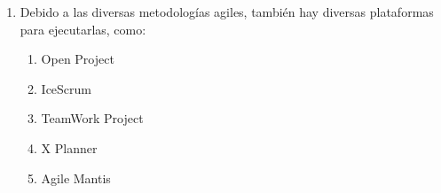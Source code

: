 \documentclass{article} %
\begin{document}
\begin{enumerate}
\item  Debido a las diversas metodolog\'{i}as agiles, tambi\'{e}n hay diversas plataformas para ejecutarlas, como:

\begin{enumerate}
\item  Open Project

\item  IceScrum

\item  TeamWork Project

\item  X Planner

\item  Agile Mantis
\end{enumerate}
\end{enumerate}

\noindent 

\noindent 
\end{document}
